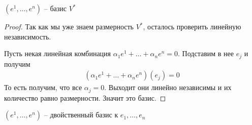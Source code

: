 \begin{theorem-non}
    $(e^1, \dots, e^n)$ -- базис $V^*$
\end{theorem-non}
\begin{proof} \quad
    
    Так как мы уже знаем размерность $V^*$, осталось проверить линейную независимость. 

    Пусть некая линейная комбинация $\alpha_1 e^1 + \dots + \alpha_n e^n = 0$.
    Подставим в нее $e_j$ и получим 
    \begin{gather*}
        (\alpha_1 e^1 + \dots + \alpha_n e^n) (e_j) = 0
    \end{gather*}
    То есть получим, что все $\alpha_j = 0$. 
    Выходит они линейно независимы и их количество равно размерности. Значит это базис.
\end{proof}

\begin{conj}
    $(e^1, \dots, e^n)$ -- двойственный базис к $e_1, \dots, e_n$
\end{conj}